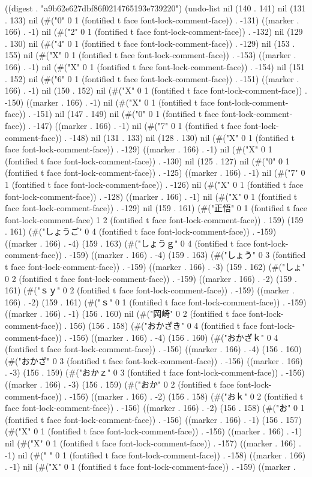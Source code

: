 
((digest . "a9b62e627dbf86f0214765193e739220") (undo-list nil (140 . 141) nil (131 . 133) nil (#("0" 0 1 (fontified t face font-lock-comment-face)) . -131) ((marker . 166) . -1) nil (#("2" 0 1 (fontified t face font-lock-comment-face)) . -132) nil (129 . 130) nil (#("4" 0 1 (fontified t face font-lock-comment-face)) . -129) nil (153 . 155) nil (#("X" 0 1 (fontified t face font-lock-comment-face)) . -153) ((marker . 166) . -1) nil (#("X" 0 1 (fontified t face font-lock-comment-face)) . -154) nil (151 . 152) nil (#("6" 0 1 (fontified t face font-lock-comment-face)) . -151) ((marker . 166) . -1) nil (150 . 152) nil (#("X" 0 1 (fontified t face font-lock-comment-face)) . -150) ((marker . 166) . -1) nil (#("X" 0 1 (fontified t face font-lock-comment-face)) . -151) nil (147 . 149) nil (#("0" 0 1 (fontified t face font-lock-comment-face)) . -147) ((marker . 166) . -1) nil (#("7" 0 1 (fontified t face font-lock-comment-face)) . -148) nil (131 . 133) nil (128 . 130) nil (#("X" 0 1 (fontified t face font-lock-comment-face)) . -129) ((marker . 166) . -1) nil (#("X" 0 1 (fontified t face font-lock-comment-face)) . -130) nil (125 . 127) nil (#("0" 0 1 (fontified t face font-lock-comment-face)) . -125) ((marker . 166) . -1) nil (#("7" 0 1 (fontified t face font-lock-comment-face)) . -126) nil (#("X" 0 1 (fontified t face font-lock-comment-face)) . -128) ((marker . 166) . -1) nil (#("X" 0 1 (fontified t face font-lock-comment-face)) . -129) nil (159 . 161) (#("正悟" 0 1 (fontified t face font-lock-comment-face) 1 2 (fontified t face font-lock-comment-face)) . 159) (159 . 161) (#("しょうご" 0 4 (fontified t face font-lock-comment-face)) . -159) ((marker . 166) . -4) (159 . 163) (#("しょうｇ" 0 4 (fontified t face font-lock-comment-face)) . -159) ((marker . 166) . -4) (159 . 163) (#("しょう" 0 3 (fontified t face font-lock-comment-face)) . -159) ((marker . 166) . -3) (159 . 162) (#("しょ" 0 2 (fontified t face font-lock-comment-face)) . -159) ((marker . 166) . -2) (159 . 161) (#("ｓｙ" 0 2 (fontified t face font-lock-comment-face)) . -159) ((marker . 166) . -2) (159 . 161) (#("ｓ" 0 1 (fontified t face font-lock-comment-face)) . -159) ((marker . 166) . -1) (156 . 160) nil (#("岡崎" 0 2 (fontified t face font-lock-comment-face)) . 156) (156 . 158) (#("おかざき" 0 4 (fontified t face font-lock-comment-face)) . -156) ((marker . 166) . -4) (156 . 160) (#("おかざｋ" 0 4 (fontified t face font-lock-comment-face)) . -156) ((marker . 166) . -4) (156 . 160) (#("おかざ" 0 3 (fontified t face font-lock-comment-face)) . -156) ((marker . 166) . -3) (156 . 159) (#("おかｚ" 0 3 (fontified t face font-lock-comment-face)) . -156) ((marker . 166) . -3) (156 . 159) (#("おか" 0 2 (fontified t face font-lock-comment-face)) . -156) ((marker . 166) . -2) (156 . 158) (#("おｋ" 0 2 (fontified t face font-lock-comment-face)) . -156) ((marker . 166) . -2) (156 . 158) (#("お" 0 1 (fontified t face font-lock-comment-face)) . -156) ((marker . 166) . -1) (156 . 157) (#("X" 0 1 (fontified t face font-lock-comment-face)) . -156) ((marker . 166) . -1) nil (#("X" 0 1 (fontified t face font-lock-comment-face)) . -157) ((marker . 166) . -1) nil (#(" " 0 1 (fontified t face font-lock-comment-face)) . -158) ((marker . 166) . -1) nil (#("X" 0 1 (fontified t face font-lock-comment-face)) . -159) ((marker . 